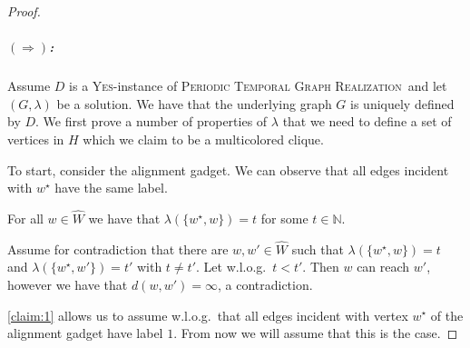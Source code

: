 \documentclass[a4paper,UKenglish,cleveref, autoref, thm-restate, anonymous]{lipics-v2021}
\newcommand{\deltaExactLong}{\textsc{Periodic Temporal Graph Realization}}
\begin{document}
\begin{proof}
\subparagraph{$(\Rightarrow)$:} Assume $D$ is a \textsc{Yes}-instance of \deltaExactLong\ and let $(G,\lambda)$ be a solution. We have that the underlying graph $G$ is uniquely defined by $D$. We first prove a number of properties of $\lambda$ that we need to define a set of vertices in $H$ which we claim to be a multicolored clique.

To start, consider the alignment gadget. We can observe that all edges incident with $w^\star$ have the same label.
\begin{claim}\label{claim:1}
    For all $w\in \hat{W}$ we have that $\lambda(\{w^\star,w\})=t$ for some $t\in\mathbb{N}$.
\end{claim}
\begin{claimproof}
    Assume for contradiction that there are $w,w'\in \hat{W}$ such that $\lambda(\{w^\star,w\})=t$ and $\lambda(\{w^\star,w'\})=t'$ with $t\neq t'$. Let w.l.o.g.\ $t<t'$. Then $w$ can reach $w'$, however we have that $d(w,w')=\infty$, a contradiction.
\end{claimproof}
\cref{claim:1} allows us to assume w.l.o.g.\ that all edges incident with vertex $w^\star$ of the alignment gadget have label $1$. From now we will assume that this is the case.


\end{proof}
\end{document}
